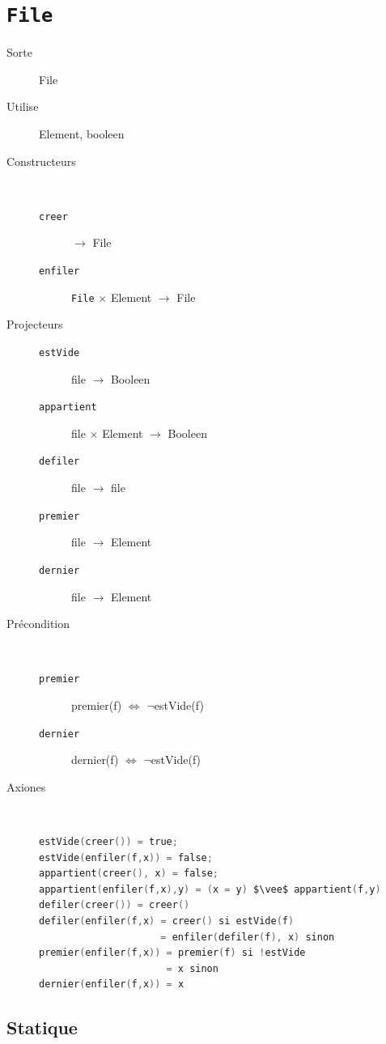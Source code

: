 \section{\texttt{File}}
\begin{description}
	\item[Sorte] File
	\item[Utilise] Element, booleen
	\item[Constructeurs]~
		\begin{description}
			\item[\texttt{creer}] $\rightarrow$ File%
			\item[\texttt{enfiler}] \texttt{File} $\times$ Element $\rightarrow$ File
		\end{description}
	\item[Projecteurs] 
		\begin{description}
			\item[\texttt{estVide}] file $\rightarrow$ Booleen
			\item[\texttt{appartient}] file $\times$ Element $\rightarrow$ Booleen
			\item[\texttt{defiler}] file $\rightarrow$ file
			\item[\texttt{premier}] file $\rightarrow$ Element
			\item[\texttt{dernier}] file $\rightarrow$ Element
		\end{description}
	\item[Précondition]~
		\begin{description}
			\item[\texttt{premier}] premier(f) $\Leftrightarrow$ $\neg$estVide(f) 
			\item[\texttt{dernier}] dernier(f) $\Leftrightarrow$ $\neg$estVide(f) 
		\end{description}
	\item[Axiones]~
\begin{lstlisting}[language=C, numbers=none,caption=Axiones du TAD File]
estVide(creer()) = true;
estVide(enfiler(f,x)) = false;
appartient(creer(), x) = false;
appartient(enfiler(f,x),y) = (x = y) $\vee$ appartient(f,y)
defiler(creer()) = creer()
defiler(enfiler(f,x) = creer() si estVide(f)
					 = enfiler(defiler(f), x) sinon
premier(enfiler(f,x)) = premier(f) si !estVide
					  = x sinon
dernier(enfiler(f,x)) = x
\end{lstlisting}
\end{description}
	\subsection{Statique}


